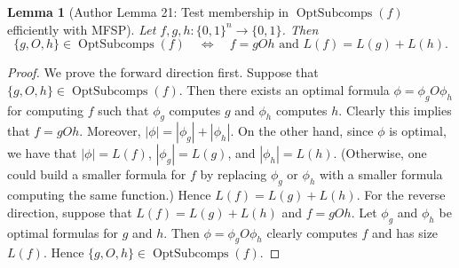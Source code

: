 \documentclass[10pt,a4paper]{article}
\newtheorem{ntlemma}[nttheorem]{Lemma}
\newcommand{\Opt}{\operatorname{OptSubcomps}}
\begin{document}
\begin{ntlemma}[Author Lemma 21: Test membership in $\Opt(f)$ efficiently with MFSP]
Let $f,g,h:\{0,1\}^n\to\{0,1\}$. Then
\[\{g,O,h\}\in\Opt(f)\quad\Longleftrightarrow\quad f=gOh\text{ and }L(f)=L(g)+L(h).\]
\end{ntlemma}
\begin{proof}
We prove the forward direction first. Suppose that $\{g,O,h\}\in\Opt(f)$. Then there exists an optimal formula $\phi=\phi_gO\phi_h$ for computing $f$ such that $\phi_g$ computes $g$ and $\phi_h$ computes $h$. Clearly this implies that $f=gOh$.
Moreover, $|\phi|=|\phi_g|+|\phi_h|$. On the other hand, since $\phi$ is optimal, we have that $|\phi|=L(f)$, $|\phi_g|=L(g)$, and $|\phi_h|=L(h)$. (Otherwise, one could build a smaller formula for $f$ by replacing $\phi_g$ or $\phi_h$ with a smaller formula computing the same function.) Hence $L(f)=L(g)+L(h)$.
For the reverse direction, suppose that $L(f)=L(g)+L(h)$ and $f=gOh$. Let $\phi_g$ and $\phi_h$ be optimal formulas for $g$ and $h$. Then $\phi=\phi_gO\phi_h$ clearly computes $f$ and has size $L(f)$. Hence $\{g,O,h\}\in\Opt(f)$.
\end{proof}
\end{document}
